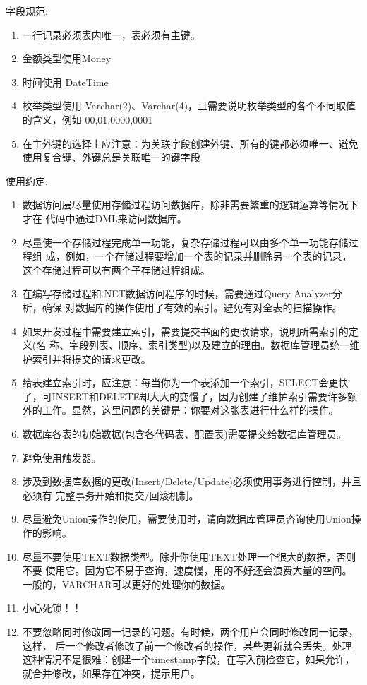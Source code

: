 字段规范:
\begin{enumerate}
	\item 一行记录必须表内唯一，表必须有主键。
	\item 金额类型使用Money 
	\item 时间使用 DateTime  
	\item 枚举类型使用 Varchar(2)、Varchar(4)，且需要说明枚举类型的各个不同取值的含义，例如 00,01,0000,0001  
	\item 在主外键的选择上应注意：为关联字段创建外键、所有的键都必须唯一、避免使用复合键、外键总是关联唯一的键字段
\end{enumerate}
使用约定:
\begin{enumerate}
	\item 数据访问层尽量使用存储过程访问数据库，除非需要繁重的逻辑运算等情况下才在 代码中通过DML来访问数据库。    
	\item 尽量使一个存储过程完成单一功能，复杂存储过程可以由多个单一功能存储过程组 成，例如，一个存储过程要增加一个表的记录并删除另一个表的记录，这个存储过程可以有两个子存储过程组成。  
	\item 在编写存储过程和.NET数据访问程序的时候，需要通过Query Analyzer分析，确保 对数据库的操作使用了有效的索引。避免有对全表的扫描操作。
	\item 如果开发过程中需要建立索引，需要提交书面的更改请求，说明所需索引的定义(名 称、字段列表、顺序、索引类型)以及建立的理由。数据库管理员统一维护索引并将提交的请求更改。
	\item 给表建立索引时，应注意：每当你为一个表添加一个索引，SELECT会更快了，可INSERT和DELETE却大大的变慢了，因为创建了维护索引需要许多额外的工作。显然，这里问题的关键是：你要对这张表进行什么样的操作。   
	\item 数据库各表的初始数据(包含各代码表、配置表)需要提交给数据库管理员。 
	\item 避免使用触发器。   
	\item 涉及到数据库数据的更改(Insert/Delete/Update)必须使用事务进行控制，并且必须有 完整事务开始和提交/回滚机制。   
	\item 尽量避免Union操作的使用，需要使用时，请向数据库管理员咨询使用Union操作的影响。 
	\item 尽量不要使用TEXT数据类型。除非你使用TEXT处理一个很大的数据，否则不要 使用它。因为它不易于查询，速度慢，用的不好还会浪费大量的空间。一般的，VARCHAR可以更好的处理你的数据。
	\item 小心死锁！！ 
	\item 不要忽略同时修改同一记录的问题。有时候，两个用户会同时修改同一记录，这样， 后一个修改者修改了前一个修改者的操作，某些更新就会丢失。处理这种情况不是很难：创建一个timestamp字段，在写入前检查它，如果允许，就合并修改，如果存在冲突，提示用户。
\end{enumerate} 

